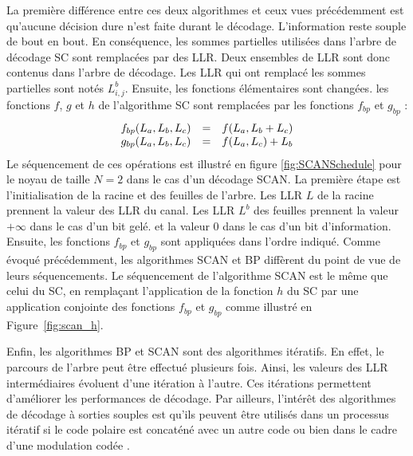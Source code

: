 La première différence entre ces deux algorithmes et ceux vues précédemment est qu'aucune décision dure n'est faite durant le décodage. L'information reste souple de bout en bout.
En conséquence, les sommes partielles utilisées dans l'arbre de décodage SC sont remplacées par des LLR. Deux ensembles de LLR sont donc contenus dans l'arbre de décodage. Les LLR qui ont remplacé les sommes partielles sont notés $L^b_{i,j}$.
Ensuite, les fonctions élémentaires sont changées. les fonctions $f$, $g$ et $h$ de l'algorithme SC sont remplacées par les fonctions $f_{bp}$ et $g_{bp}$ :
\begin{eqnarray}
  \begin{array}{l c l}
    f_{bp}(L_a,L_b,L_c) & = & f(L_a, L_b  + L_c) \\
    g_{bp}(L_a,L_b,L_c) & = & f(L_a, L_c) + L_b
  \end{array}
  \label{eq:bp}
\end{eqnarray}
Le séquencement de ces opérations est illustré en figure \ref{fig:SCANSchedule} pour le noyau de taille $N=2$ dans le cas d'un décodage SCAN. La première étape est l'initialisation de la racine et des feuilles de l'arbre. Les LLR $L$ de la racine prennent la valeur des LLR du canal. Les LLR $L^b$ des feuilles prennent la valeur $+\infty$ dans le cas d'un bit gelé. et la valeur $0$ dans le cas d'un bit d'information. Ensuite, les fonctions $f_{bp}$ et $g_{bp}$ sont appliquées dans l'ordre indiqué.
Comme évoqué précédemment, les algorithmes SCAN et BP diffèrent du point de vue de leurs séquencements. Le séquencement de l'algorithme SCAN est le même que celui du SC, en remplaçant l'application de la fonction $h$ du SC par une application conjointe des fonctions $f_{bp}$ et $g_{bp}$ comme illustré en Figure~\ref{fig:scan_h}.

Enfin, les algorithmes BP et SCAN sont des algorithmes itératifs. En effet, le parcours de l'arbre peut être effectué plusieurs fois. Ainsi, les valeurs des LLR intermédiaires évoluent d'une itération à l'autre. Ces itérations permettent d'améliorer les performances de décodage.
Par ailleurs, l'intérêt des algorithmes de décodage à sorties souples est qu'ils peuvent être utilisés dans un processus itératif si le code polaire est concaténé avec un autre code \cite{balatsoukas-stimming_polar_2017} ou bien dans le cadre d'une modulation codée \cite{dai_polar_2016}.

